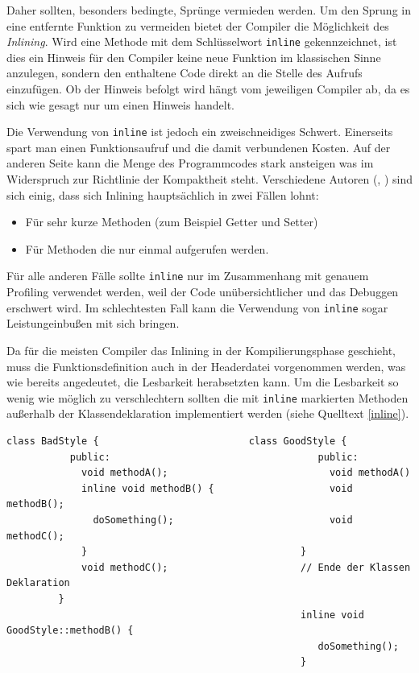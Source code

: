 Daher sollten, besonders bedingte, Sprünge vermieden werden. Um den Sprung in eine entfernte Funktion zu vermeiden bietet der Compiler die Möglichkeit des \textit{Inlining}. Wird eine Methode mit dem Schlüsselwort \verb|inline| gekennzeichnet, ist dies ein Hinweis für den Compiler keine neue Funktion im klassischen Sinne anzulegen, sondern den enthaltene Code direkt an die Stelle des Aufrufs einzufügen. Ob der Hinweis befolgt wird hängt vom jeweiligen Compiler ab, da es sich wie gesagt nur um einen Hinweis handelt.

Die Verwendung von \verb|inline| ist jedoch ein zweischneidiges Schwert. Einerseits spart man einen Funktionsaufruf und die damit verbundenen Kosten. Auf der anderen Seite kann die Menge des Programmcodes stark ansteigen was im Widerspruch zur Richtlinie der Kompaktheit steht. Verschiedene Autoren (\cite{Drepper07}, \cite{Meyers06}) sind sich einig, dass sich Inlining hauptsächlich in zwei Fällen lohnt:
\begin{itemize}
 \item Für sehr kurze Methoden (zum Beispiel Getter und Setter)
 \item Für Methoden die nur einmal aufgerufen werden.
\end{itemize}

Für alle anderen Fälle sollte \verb|inline| nur im Zusammenhang mit genauem Profiling verwendet werden, weil der Code unübersichtlicher und das Debuggen erschwert wird. Im schlechtesten Fall kann die Verwendung von  \verb|inline| sogar Leistungeinbußen mit sich bringen.

Da für die meisten Compiler das Inlining in der Kompilierungsphase geschieht, muss die Funktionsdefinition auch in der Headerdatei vorgenommen werden, was wie bereits angedeutet, die Lesbarkeit herabsetzten kann. Um die Lesbarkeit so wenig wie möglich zu verschlechtern sollten die mit \verb|inline| markierten Methoden außerhalb der Klassendeklaration implementiert werden (siehe Quelltext \ref{inline}).

\begin{lstlisting}[float,belowcaptionskip=8pt,caption={[Sinnvoller Einsatz von inlining]links: Definition aller Inlinemethoden mindert Lesbarkeit. rechts: Getrennte Definition der Methoden macht Schnittstelle der Klasse klar erkennbar},label=inline]
         class BadStyle {                          class GoodStyle {
           public:                                    public:
             void methodA();                            void methodA()
             inline void methodB() {                    void methodB();
               doSomething();                           void methodC();
             }                                     }
             void methodC();                       // Ende der Klassen Deklaration
         }                             
                                                   inline void GoodStyle::methodB() {
                                                      doSomething();
                                                   }
\end{lstlisting}

